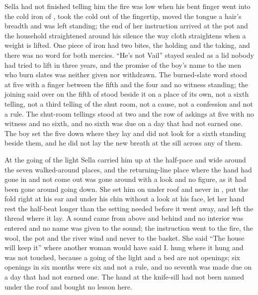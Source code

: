Sella had not finished telling him the fire was low when his bent finger went into the cold iron of , took the cold out of the fingertip, moved the tongue a hair's breadth and was left standing; the end of her instruction arrived at the pot and the household straightened around his silence the way cloth straightens when a weight is lifted. One piece of iron had two bites, the holding and the taking, and there was no  word for both mercies. “He's not Vail” stayed sealed as a lid nobody had tried to lift in three years, and the promise of the boy's name to the men who burn slates was neither given nor withdrawn. The burned-slate word stood at five with a finger between the fifth and the four and no witness standing; the joining said over  on the fifth of  stood beside it on a place of its own, not a sixth telling, not a third telling of the shut room, not a cause, not a confession and not a rule. The shut-room tellings stood at two and the row of askings at five with no witness and no sixth, and no sixth was due on a day that had not earned one. The boy set the five down where they lay and did not look for a sixth standing beside them, and he did not lay the new breath at the sill across any of them.

\scenebreak

At the going of the light Sella carried him up at the half-pace and wide around the seven walked-around places, and the returning-line place where the hand had gone in and not come out was gone around with a look and no figure, as it had been gone around going down. She set him on  under  roof and never in , put the fold right at his ear and under his chin without a look at his face, let her hand rest the half-beat longer than the setting needed before it went away, and left the thread where it lay. A sound came from above and behind and no interior was entered and no name was given to the sound; the instruction went to the fire, the wool, the pot and the river wind and never to the basket. She said “The house will keep it” where another woman would have said I.  hung where it hung and was not touched, because a going of the light and a bed are not openings; six openings in six months were six and not a rule, and no seventh was made due on a day that had not earned one. The hand at the knife-sill had not been named under the roof and bought no lesson here.

